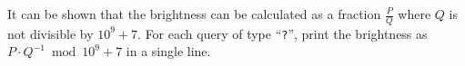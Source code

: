 
	It can be shown that the brightness can be calculated as a fraction $\frac{P}{Q}$ where $Q$ is not divisible by $10^9+7$.
	For each query of type ``\texttt{?}'', print the brightness as $P\cdot Q^{-1} \bmod 10^9+7$ in a single line.
